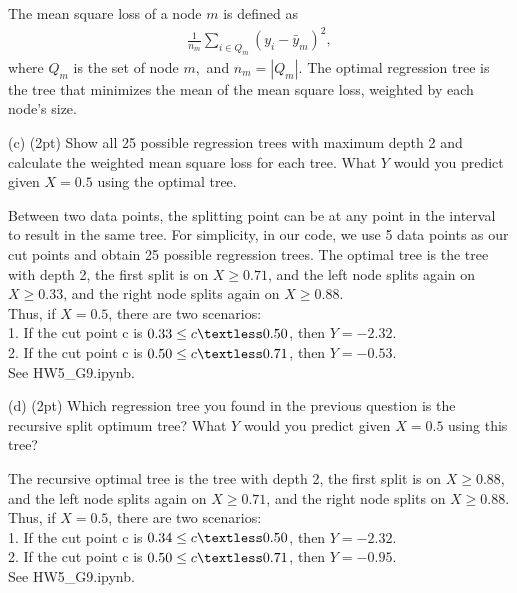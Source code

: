 \documentclass[11pt, oneside]{exam}   	%
\begin{document}
The mean square loss of a node $m$ is defined as
\begin{align*}
	\frac{1}{n_m}\sum_{i\in Q_m}(y_i - \bar{y}_m)^2,
\end{align*}
where $Q_m$ is the set of node $m,$ and $n_m=|Q_m|.$
The optimal regression tree is the tree that minimizes the mean of the  mean square loss,
weighted by each node's size.

(c) (2pt) Show all 25 possible regression trees with maximum depth 2 and calculate the weighted mean square loss for each tree.
What $Y$ would you predict given $X=0.5$ using the optimal tree.
\begin{solution}
Between two data points, the splitting point can be at any point in the interval to result in the same tree. For simplicity, in our code, we use 5 data points as our cut points and obtain 25 possible regression trees. The optimal tree is the tree with depth 2, the first split is on $X\geq 0.71$, and the left node splits again on $X\geq 0.33$, and the right node splits again on  $X\geq 0.88$. \\

Thus, if $X=0.5$, there are two scenarios: \\
    1. If the cut point c is $0.33\leq c\textless 0.50$, then $Y=-2.32$. \\
    2. If the cut point c is $0.50\leq c\textless 0.71$, then $Y=-0.53$. \\
    
See HW5\_G9.ipynb.
\end{solution}

(d) (2pt) Which regression tree you found in the previous question is the recursive split optimum tree? What $Y$ would you predict given $X=0.5$ using this tree?

\begin{solution}
The recursive optimal tree is the tree with depth 2, the first split is on $X\geq 0.88$, and the left node splits again on $X\geq 0.71$, and the right node splits on $X\geq 0.88$. \\

Thus, if $X=0.5$, there are two scenarios: \\
    1. If the cut point c is $0.34\leq c\textless 0.50$, then $Y=-2.32$. \\
    2. If the cut point c is $0.50\leq c\textless 0.71$, then $Y=-0.95$.  \\
    
See HW5\_G9.ipynb.
\end{solution}
\end{document}
